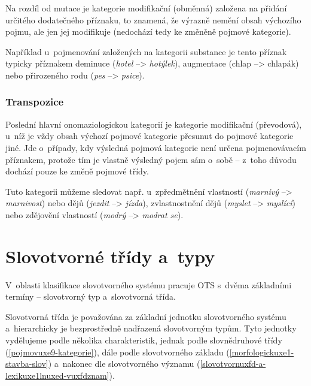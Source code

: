 Na rozdíl od mutace je kategorie modifikační (obměnná) založena na
přidání určitého dodatečného příznaku, to znamená, že výrazně nemění
obsah výchozího pojmu, ale jen jej modifikuje (nedochází tedy ke změněně
pojmové kategorie).~\parencite[102]{dokulil00}

Například u~pojmenování založených na kategorii substance je tento
příznak typicky příznakem deminuce (\emph{hotel} --\textgreater{}
\emph{hotýlek}), augmentace (chlap --\textgreater{} chlapák) nebo
přirozeného rodu (\emph{pes} --\textgreater{} \emph{psice}).

\hypertarget{transpozice}{%
\subsubsection{Transpozice}\label{transpozice}}

Poslední hlavní onomaziologickou kategorií je kategorie modifikační
(převodová), u~níž je vždy obsah výchozí pojmové kategorie přesunut do
pojmové kategorie jiné. Jde o~případy, kdy výsledná pojmová kategorie
není určena pojmenovávacím příznakem, protože tím je vlastně výsledný
pojem sám o~sobě -- z~toho důvodu dochází pouze ke změně pojmové třídy.
\parencite[103]{dokulil00}

Tuto kategorii můžeme sledovat např. u~zpředmětnění vlastností
(\emph{marnivý} --\textgreater{} \emph{marnivost}) nebo dějů
(\emph{jezdit} --\textgreater{} \emph{jízda}), zvlastnostnění dějů
(\emph{myslet} --\textgreater{} \emph{myslící}) nebo zdějovění
vlastností (\emph{modrý} --\textgreater{} \emph{modrat se}).

\hypertarget{slovotvornuxe9-tux159uxeddy-a-typy}{%
\section{Slovotvorné třídy
a~typy}\label{slovotvornuxe9-tux159uxeddy-a-typy}}

V~oblasti klasifikace slovotvorného systému pracuje OTS s~dvěma
základními termíny -- slovotvorný typ a~slovotvorná třída.

Slovotvorná třída je považována za základní jednotku slovotvorného
systému a~hierarchicky je bezprostředně nadřazená slovotvorným typům.
Tyto jednotky vydělujeme podle několika charakteristik, jednak podle
slovnědruhové třídy (\ref{pojmovuxe9-kategorie}), dále podle
slovotvorného základu (\ref{morfologickuxe1-stavba-slov}) a~nakonec dle
slovotvorného významu
(\ref{slovotvornuxfd-a-lexikuxe1lnuxed-vuxfdznam}).
\parencite[107]{dokulil00}

